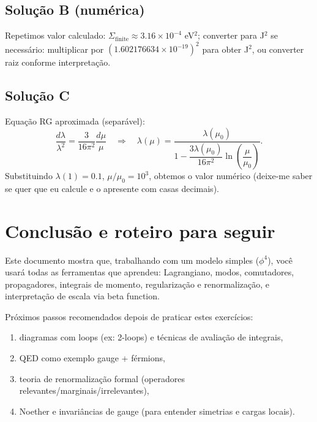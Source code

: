 \documentclass[12pt,a4paper]{article}
\begin{document}
\subsection{Solução B (numérica)}
Repetimos valor calculado: \(\Sigma_{\text{finite}} \approx 3.16\times10^{-4}\) eV\(^2\); converter para J\(^2\) se necessário: multiplicar por \((1.602176634\times10^{-19})^2\) para obter J\(^2\), ou converter raiz conforme interpretação.

\subsection{Solução C}
Equação RG aproximada (separável):
\[
\frac{d\lambda}{\lambda^2} = \frac{3}{16\pi^2} \frac{d\mu}{\mu} \quad\Rightarrow\quad
\lambda(\mu) = \frac{\lambda(\mu_0)}{1 - \dfrac{3\lambda(\mu_0)}{16\pi^2} \ln\!\left(\dfrac{\mu}{\mu_0}\right)}.
\]
Substituindo \(\lambda(1) = 0.1\), \(\mu/\mu_0 = 10^3\), obtemos o valor numérico (deixe-me saber se quer que eu calcule e o apresente com casas decimais).

\section{Conclusão e roteiro para seguir}
Este documento mostra que, trabalhando com um modelo simples (\(\phi^4\)), você usará todas as ferramentas que aprendeu: Lagrangiano, modos, comutadores, propagadores, integrais de momento, regularização e renormalização, e interpretação de escala via beta function.

Próximos passos recomendados depois de praticar estes exercícios:
\begin{enumerate}
\item diagramas com loops (ex: 2-loops) e técnicas de avaliação de integrais,
\item QED como exemplo gauge + férmions,
\item teoria de renormalização formal (operadores relevantes/marginais/irrelevantes),
\item Noether e invariâncias de gauge (para entender simetrias e cargas locais).
\end{enumerate}
\end{document}
